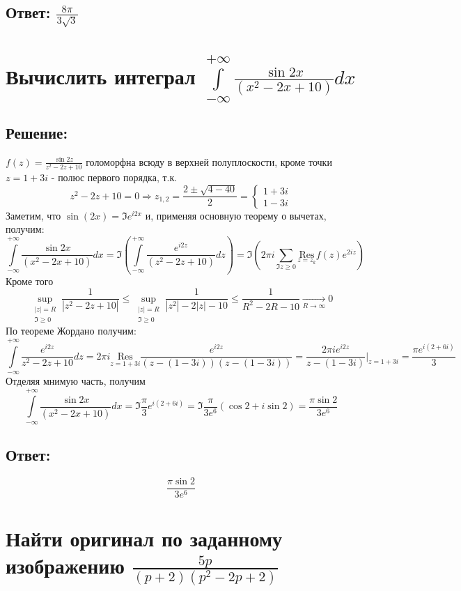 \documentclass{article}
\begin{document}
	\subsection{Ответ: $\frac{8\pi}{3\sqrt{3}}$}
	
	
	\section{Вычислить интеграл $\int\limits_{-\infty}^{+\infty} \frac{\sin 2x}{\left(x^2 - 2x + 10\right)}dx$}

	\subsection{Решение:}
		$f(z) = \frac{\sin 2z}{z^2 -2z+10}$ голоморфна всюду в верхней полуплоскости, кроме точки $z  =1+3i$ - полюс первого порядка, т.к.
	\[z^2 -2z + 10 = 0 \Rightarrow z_{1,2} = \frac{2 \pm \sqrt{4 - 40}}{2} = \begin{cases}
		1 + 3i \\
		1 - 3i
	\end{cases}\]
	Заметим, что $\sin(2x) = \Im e^{i2x} $ и, применяя основную теорему о вычетах, получим:
	\[\int\limits_{-\infty}^{+\infty} \frac{\sin 2x}{\left(x^2 - 2x + 10\right)}dx = \Im \left(\int\limits_{-\infty}^{+\infty} \frac{e^{i2z}}{\left(z^2 - 2z + 10\right)}dz\right) = \Im \left(2\pi i \sum_{\Im z \ge 0} \underset{z=z_k}{\text{Res}}f(z)e^{2iz}\right)\]
	Кроме того
	\[\sup\limits_{\substack{|z|= R\\\Im\ge0}} \frac{1}{|z^2 -2z +10|} \le\sup\limits_{\substack{|z|= R\\\Im\ge0}}\frac{1}{|z^2|- 2|z| - 10} \le \frac{1}{R^2 -2R - 10} \underset{R\rightarrow \infty}{\rightarrow} 0\]
	По теореме Жордано получим:
	\[\int\limits_{-\infty}^{+\infty} \frac{e^{i2z}}{z^2 -2z + 10} dz= 2 \pi i \underset{z = 1 + 3i}{\text{Res}}\frac{e^{i2z}}{(z-(1-3i))(z-(1-3i))} = \frac{2\pi i e ^{i2z}}{z-(1-3i)}\Big|_{z=1+3i} = \frac{\pi e^{i(2+6i)}}{3}\]
	Отделяя мнимую часть, получим
	\[\int\limits_{-\infty}^{+\infty} \frac{\sin 2x}{\left(x^2 - 2x + 10\right)}dx = \Im \frac{\pi}{3}e^{i(2+6i)} = \Im \frac{\pi}{3 e^6} (\cos 2 + i \sin 2) = \frac{\pi \sin 2}{3e^{6}}\]
	\subsection{Ответ:}
	\[\frac{\pi \sin 2}{3e^{6}}\]
	
	
	\section{Найти оригинал по заданному изображению $\frac{5p}{(p+2)(p^2-2p+2)}$}
\end{document}
